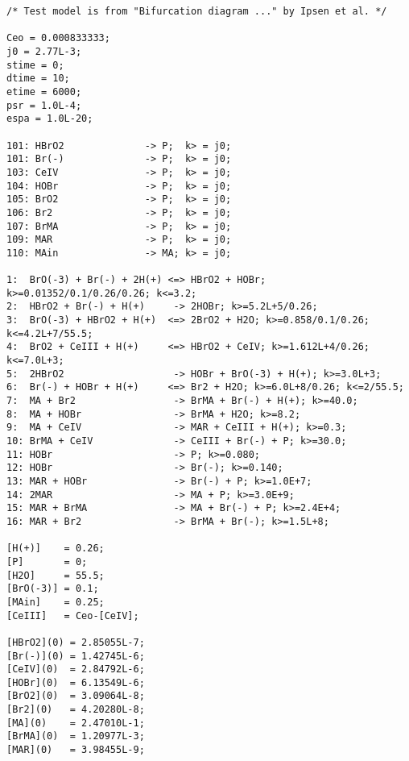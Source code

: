 {\footnotesize
\begin{verbatim}
/* Test model is from "Bifurcation diagram ..." by Ipsen et al. */

Ceo = 0.000833333;
j0 = 2.77L-3;
stime = 0;
dtime = 10;
etime = 6000;
psr = 1.0L-4;
espa = 1.0L-20;

101: HBrO2              -> P;  k> = j0;
101: Br(-)              -> P;  k> = j0;
103: CeIV               -> P;  k> = j0;
104: HOBr               -> P;  k> = j0;
105: BrO2               -> P;  k> = j0;
106: Br2                -> P;  k> = j0;
107: BrMA               -> P;  k> = j0;
109: MAR                -> P;  k> = j0;
110: MAin               -> MA; k> = j0;

1:  BrO(-3) + Br(-) + 2H(+) <=> HBrO2 + HOBr; k>=0.01352/0.1/0.26/0.26; k<=3.2;
2:  HBrO2 + Br(-) + H(+)     -> 2HOBr; k>=5.2L+5/0.26;
3:  BrO(-3) + HBrO2 + H(+)  <=> 2BrO2 + H2O; k>=0.858/0.1/0.26; k<=4.2L+7/55.5;
4:  BrO2 + CeIII + H(+)     <=> HBrO2 + CeIV; k>=1.612L+4/0.26; k<=7.0L+3;
5:  2HBrO2                   -> HOBr + BrO(-3) + H(+); k>=3.0L+3;
6:  Br(-) + HOBr + H(+)     <=> Br2 + H2O; k>=6.0L+8/0.26; k<=2/55.5;
7:  MA + Br2                 -> BrMA + Br(-) + H(+); k>=40.0;
8:  MA + HOBr                -> BrMA + H2O; k>=8.2;
9:  MA + CeIV                -> MAR + CeIII + H(+); k>=0.3;
10: BrMA + CeIV              -> CeIII + Br(-) + P; k>=30.0;
11: HOBr                     -> P; k>=0.080;
12: HOBr                     -> Br(-); k>=0.140;
13: MAR + HOBr               -> Br(-) + P; k>=1.0E+7;
14: 2MAR                     -> MA + P; k>=3.0E+9;
15: MAR + BrMA               -> MA + Br(-) + P; k>=2.4E+4;
16: MAR + Br2                -> BrMA + Br(-); k>=1.5L+8;

[H(+)]    = 0.26;
[P]       = 0;
[H2O]     = 55.5;
[BrO(-3)] = 0.1;
[MAin]    = 0.25;
[CeIII]   = Ceo-[CeIV];

[HBrO2](0) = 2.85055L-7;
[Br(-)](0) = 1.42745L-6;
[CeIV](0)  = 2.84792L-6;
[HOBr](0)  = 6.13549L-6;
[BrO2](0)  = 3.09064L-8;
[Br2](0)   = 4.20280L-8;
[MA](0)    = 2.47010L-1;
[BrMA](0)  = 1.20977L-3;
[MAR](0)   = 3.98455L-9;
\end{verbatim}
}

